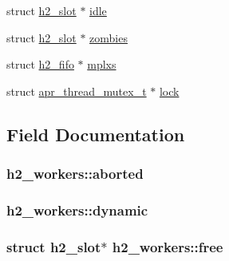 \begin{DoxyCompactItemize}
\item 
struct \hyperlink{structh2__slot}{h2\+\_\+slot} $\ast$ \hyperlink{structh2__workers_a9d29faea794dfa06c29fa4d957412547}{idle}
\item 
struct \hyperlink{structh2__slot}{h2\+\_\+slot} $\ast$ \hyperlink{structh2__workers_ad89027960968f58c4276e95c68eb70c5}{zombies}
\item 
struct \hyperlink{structh2__fifo}{h2\+\_\+fifo} $\ast$ \hyperlink{structh2__workers_a091c5f9521ae6dae1f01221fb3bf50c9}{mplxs}
\item 
struct \hyperlink{structapr__thread__mutex__t}{apr\+\_\+thread\+\_\+mutex\+\_\+t} $\ast$ \hyperlink{structh2__workers_a7a483e64d1eb98bdac0f2e41d1ffeae9}{lock}
\end{DoxyCompactItemize}


\subsection{Field Documentation}
\subsubsection[{\texorpdfstring{aborted}{aborted}}]{ h2\+\_\+workers\+::aborted}\hypertarget{structh2__workers_a48a7643eac9625106ea9b3cd60e39bab}{}\label{structh2__workers_a48a7643eac9625106ea9b3cd60e39bab}
\subsubsection[{\texorpdfstring{dynamic}{dynamic}}]{ h2\+\_\+workers\+::dynamic}\hypertarget{structh2__workers_a00d0f096c6b8b1946852a34c202253cb}{}\label{structh2__workers_a00d0f096c6b8b1946852a34c202253cb}
\subsubsection[{\texorpdfstring{free}{free}}]{\setlength{\rightskip}{0pt plus 5cm}struct {\bf h2\+\_\+slot}$\ast$ h2\+\_\+workers\+::free}\hypertarget{structh2__workers_ae9f9de2d0be6f92c6a5e54056800f2e9}{}\label{structh2__workers_ae9f9de2d0be6f92c6a5e54056800f2e9}
